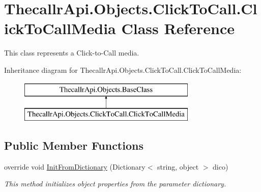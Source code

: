 \hypertarget{class_thecallr_api_1_1_objects_1_1_click_to_call_1_1_click_to_call_media}{\section{Thecallr\+Api.\+Objects.\+Click\+To\+Call.\+Click\+To\+Call\+Media Class Reference}
\label{class_thecallr_api_1_1_objects_1_1_click_to_call_1_1_click_to_call_media}
}


This class represents a Click-\/to-\/\+Call media.  


Inheritance diagram for Thecallr\+Api.\+Objects.\+Click\+To\+Call.\+Click\+To\+Call\+Media\+:\begin{figure}[H]
\begin{center}
\leavevmode
\includegraphics[height=2.000000cm]{class_thecallr_api_1_1_objects_1_1_click_to_call_1_1_click_to_call_media}
\end{center}
\end{figure}
\subsection*{Public Member Functions}
\begin{DoxyCompactItemize}
\item 
override void \hyperlink{class_thecallr_api_1_1_objects_1_1_click_to_call_1_1_click_to_call_media_a63e7e5726b94528991ac03ad56ffa7c1}{Init\+From\+Dictionary} (Dictionary$<$ string, object $>$ dico)
\begin{DoxyCompactList}\small\item\em This method initializes object properties from the parameter dictionary. \end{DoxyCompactList}\end{DoxyCompactItemize}
